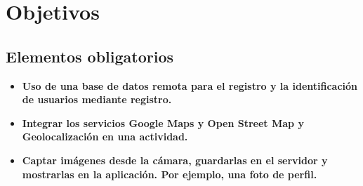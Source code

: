 \documentclass[a4paper,12pt]{report}
\begin{document}
  \chapter{Objetivos}
    \section{Elementos obligatorios}
      \begin{itemize}
        \item \textbf{Uso de una base de datos remota para el registro y la identificación de usuarios mediante registro.}
        \item \textbf{Integrar los servicios Google Maps y Open Street Map y Geolocalización en una actividad.}
        \item \textbf{Captar imágenes desde la cámara, guardarlas en el servidor y mostrarlas en la aplicación. Por ejemplo, una foto de perfil.}
      \end{itemize}
\end{document}
